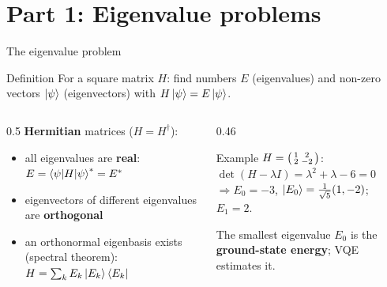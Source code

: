 \documentclass[aspectratio=169,11pt]{beamer}
\newcommand{\hl}[1]{{\color{qorange}\textbf{#1}}}
\newcommand{\key}[1]{{\color{qdark}\textbf{#1}}}
\begin{document}
\section{Part 1: Eigenvalue problems}
\begin{frame}{The eigenvalue problem}
  \begin{block}{Definition}
    For a square matrix $H$: find numbers $E$ (eigenvalues) and non-zero vectors $\ket\psi$ (eigenvectors) with $H\ket\psi = E\ket\psi$.
  \end{block}
  \begin{columns}[T]
    \begin{column}{0.5\textwidth}
      \key{Hermitian} matrices ($H = H^\dagger$):
      \begin{itemize}
        \item all eigenvalues are \hl{real}: $E = \braket{\psi|H|\psi}^* = E^*$
        \item eigenvectors of different eigenvalues are \hl{orthogonal}
        \item an orthonormal eigenbasis exists (spectral theorem): $H = \sum_kE_k\ket{E_k}\bra{E_k}$
      \end{itemize}
    \end{column}
    \begin{column}{0.46\textwidth}
      \begin{exampleblock}{Example}
        $H = \begin{psmallmatrix}1&2\\2&-2\end{psmallmatrix}$: $\det(H - \lambda I) = \lambda^2 + \lambda - 6 = 0$\\
        $\Rightarrow E_0 = -3$, $\ket{E_0} = \frac{1}{\sqrt5}(1, -2)$; \ $E_1 = 2$.
      \end{exampleblock}
      The smallest eigenvalue $E_0$ is the \key{ground-state energy}; VQE estimates it.
    \end{column}
  \end{columns}
\end{frame}
\end{document}
